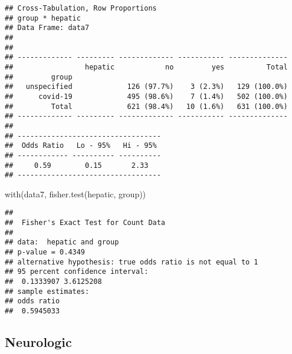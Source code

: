 \documentclass[
]{article}
\newenvironment{Shaded}{\begin{snugshade}}{\end{snugshade}}
\newcommand{\AttributeTok}[1]{\textcolor[rgb]{0.77,0.63,0.00}{#1}}
\newcommand{\ConstantTok}[1]{\textcolor[rgb]{0.00,0.00,0.00}{#1}}
\newcommand{\FunctionTok}[1]{\textcolor[rgb]{0.00,0.00,0.00}{#1}}
\newcommand{\NormalTok}[1]{#1}
\newcommand{\SpecialCharTok}[1]{\textcolor[rgb]{0.00,0.00,0.00}{#1}}
\newcommand{\StringTok}[1]{\textcolor[rgb]{0.31,0.60,0.02}{#1}}
\begin{document}
\begin{verbatim}
## Cross-Tabulation, Row Proportions  
## group * hepatic  
## Data Frame: data7  
## 
## 
## ------------- --------- ------------- ----------- --------------
##                 hepatic            no         yes          Total
##         group                                                   
##   unspecified             126 (97.7%)    3 (2.3%)   129 (100.0%)
##      covid-19             495 (98.6%)    7 (1.4%)   502 (100.0%)
##         Total             621 (98.4%)   10 (1.6%)   631 (100.0%)
## ------------- --------- ------------- ----------- --------------
## 
## ----------------------------------
##  Odds Ratio   Lo - 95%   Hi - 95% 
## ------------ ---------- ----------
##     0.59        0.15       2.33   
## ----------------------------------
\end{verbatim}

\begin{Shaded}
\begin{Highlighting}[]
\FunctionTok{with}\NormalTok{(data7, }\FunctionTok{fisher.test}\NormalTok{(hepatic, group))}
\end{Highlighting}
\end{Shaded}

\begin{verbatim}
## 
##  Fisher's Exact Test for Count Data
## 
## data:  hepatic and group
## p-value = 0.4349
## alternative hypothesis: true odds ratio is not equal to 1
## 95 percent confidence interval:
##  0.1333907 3.6125208
## sample estimates:
## odds ratio 
##  0.5945033
\end{verbatim}

\hypertarget{neurologic}{%
\subsection{Neurologic}\label{neurologic}}

\begin{Shaded}
\end{Shaded}
\end{document}
